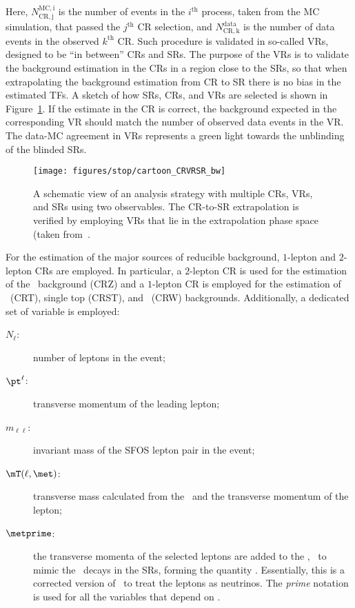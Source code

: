 		\noindent Here, $N_{\mathrm{CR,j}}^{\mathrm{MC,i}}$ is the number of events in the $i^{\mathrm{th}}$ process, taken from the \ac{MC} simulation, that passed the $j^{\mathrm{th}}$ CR selection, and $N_{\mathrm{CR,k}}^{\mathrm{data}}$ is the number of data events in the observed $k^{\mathrm{th}}$ \ac{CR}. Such procedure is validated in so-called \acp{VR}, designed to be ``in between'' \acp{CR} and \acp{SR}. The purpose of the \acp{VR} is to validate the background estimation in the \acp{CR} in a region close to the \acp{SR}, so that when extrapolating the background estimation from \ac{CR} to \ac{SR} there is no bias in the estimated \acp{TF}. A sketch of how \acp{SR}, \acp{CR}, and \acp{VR} are selected is shown in Figure~\ref{fig:extrapolation}. If the estimate in the \ac{CR} is correct, the background expected in the corresponding \ac{VR} should match the number of observed data events in the \ac{VR}. The data-\ac{MC} agreement in \acp{VR} represents a green light towards the unblinding of the blinded \acp{SR}.

		\begin{figure}[!htb]
		  \begin{center}
		   \texttt{[image: figures/stop/cartoon\_CRVRSR\_bw]}
		   \caption{A schematic view of an analysis strategy with multiple \acp{CR}, \acp{VR}, and \acp{SR} using two observables. The \ac{CR}-to-\ac{SR} extrapolation is verified by employing \acp{VR} that lie in the extrapolation phase space (taken from~\cite{histfitter}.}
		   \label{fig:extrapolation}
		  \end{center}
		\end{figure}

		For the estimation of the major sources of reducible background, $1$-lepton and $2$-lepton \acp{CR} are employed. In particular, a $2$-lepton \ac{CR} is used for the estimation of the \Zjets\ background (CRZ) and a $1$-lepton \ac{CR} is employed for the estimation of \ttbar\ (CRT), single top (CRST), and \Wjets\ (CRW) backgrounds. Additionally, a dedicated set of variable is employed:

		\begin{description}
			\item[\boldmath $N_{\ell}$:] number of leptons in the event;
			\item[\boldmath $\pt^{\ell}$:] transverse momentum of the leading lepton;
			\item[\boldmath $m_{\ell\ell}$:] invariant mass of the \ac{SFOS} lepton pair in the event;
			\item[\boldmath $\mT(\ell,\met)$:] transverse mass calculated from the \met\ and the transverse momentum of the lepton;  
			\item[\boldmath $\metprime$:] the transverse momenta of the selected leptons are added to the \ptmiss, \eg\ to mimic the \Znunu\ decays in the \acp{SR}, forming the quantity \metprime. Essentially, this is a corrected version of \met\ to treat the leptons as neutrinos. The \emph{prime} notation is used for all the variables that depend on \metprime.
		\end{description}


